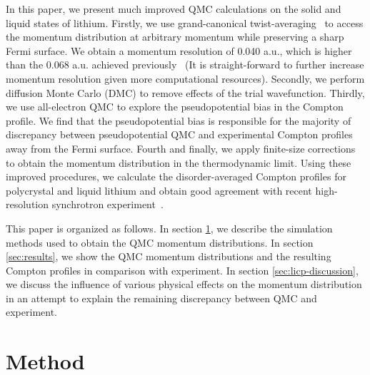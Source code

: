 \documentclass[aps,prb,showpacs,preprintnumbers,amsmath,amssymb,superscriptaddress,twocolumn]{revtex4-1}
\begin{document}
In this paper, we present much improved QMC calculations on the solid and liquid states of lithium. Firstly, we use grand-canonical twist-averaging~\cite{Lin2001,Holzmann2016} to access the momentum distribution at arbitrary momentum while preserving a sharp Fermi surface. We obtain a momentum resolution of 0.040 a.u., which is higher than the 0.068 a.u. achieved previously~\cite{Filippi1999} (It is straight-forward to further increase momentum resolution given more computational resources). Secondly, we perform diffusion Monte Carlo (DMC) to remove effects of the trial wavefunction. Thirdly, we use all-electron QMC to explore the pseudopotential bias in the Compton profile. We find that the pseudopotential bias is responsible for the majority of discrepancy between pseudopotential QMC and experimental Compton profiles away from the Fermi surface. Fourth and finally, we apply finite-size corrections~\cite{Holzmann2009,Holzmann2011} to obtain the momentum distribution in the thermodynamic limit. Using these improved procedures, we calculate the disorder-averaged Compton profiles for polycrystal and liquid lithium and obtain good agreement with recent high-resolution synchrotron experiment~\cite{Nozomu2019}.

This paper is organized as follows. In section \ref{sec:method}, we describe the simulation methods used to obtain the QMC momentum distributions. In section \ref{sec:results}, we show the QMC momentum distributions and the resulting Compton profiles in comparison with experiment. In section \ref{sec:licp-discussion}, we discuss the influence of various physical effects on the momentum distribution in an attempt to explain the remaining discrepancy between QMC and experiment.

\section{Method} \label{sec:method}
\end{document}
